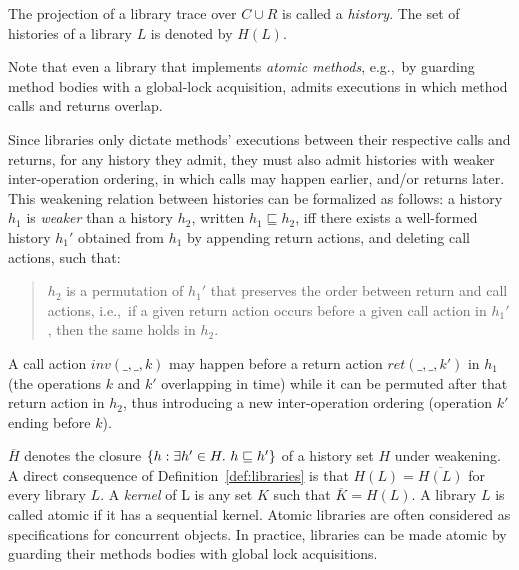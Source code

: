 The projection of a library trace over $C\cup R$ is called a \emph{history}. The set of histories of a library $L$ is denoted by $H(L)$.

Note that even a library that implements \emph{atomic methods}, e.g.,~by
guarding method bodies with a global-lock acquisition, admits executions in
which method calls and returns overlap. 

Since libraries only dictate methods’ executions between their respective calls and returns, for any history they admit, they must also 
admit histories with weaker inter-operation ordering, in which calls may happen earlier, and/or returns later. This weakening relation
between histories can be formalized as follows: a history $h_1$ is \emph{weaker} than a history $h_2$, written $h_1 \sqsubseteq h_2$, 
if{f} there exists a well-formed history $h_1'$
obtained from $h_1$ by appending return actions, and deleting call actions,
such that:
\begin{quote}

  $h_2$ is a permutation of $h_1'$ that preserves the order between
  return and call actions, i.e.,~if a given return action occurs before a given
  call action in $h_1'$, then the same holds in $h_2$.

\end{quote}
A call action $inv(\_,\_,k)$ may happen before a return action $ret(\_,\_,k')$ in $h_1$ (the operations $k$ and $k'$ overlapping in time) while it can be permuted after that return action in $h_2$, thus introducing a new inter-operation ordering (operation $k'$ ending before $k$). 

$\overline{H}$ denotes the closure ${\{ h: \exists h' \in H.\ h \sqsubseteq h' \}}$ of a 
history set $H$ under weakening.
A direct consequence of Definition~\ref{def:libraries} is that $H(L)=\overline{H(L)}$ for
every library $L$. A \emph{kernel} of L is any set $K$ such that $\overline{K} = H(L)$.
A library $L$ is called atomic if it has a sequential kernel. 
Atomic libraries are often considered as specifications for concurrent objects. 
In practice, libraries can be made atomic by guarding their methods bodies with global lock acquisitions.

